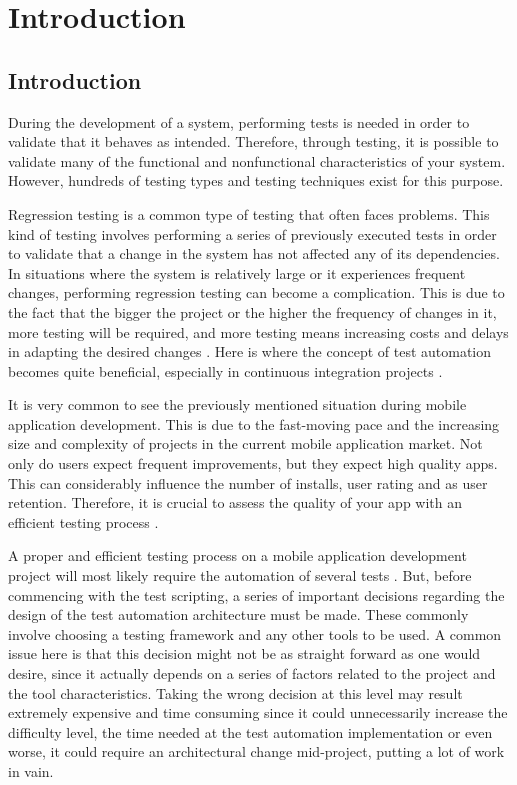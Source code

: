%
\chapter{Introduction}
\label{sec:intro}

\section{Introduction}

During the development of a system, performing tests is needed in order to validate that it behaves as intended. Therefore, through testing, it is possible to validate many of the functional and nonfunctional characteristics of your system. However, hundreds of testing types and testing techniques exist for this purpose.

Regression testing is a common type of testing that often faces problems. This kind of testing involves performing a series of previously executed tests in order to validate that a change in the system has not affected any of its dependencies. In situations where the system is relatively large or it experiences frequent changes, performing regression testing can become a complication. This is due to the fact that the bigger the project or the higher the frequency of changes in it, more testing will be required, and more testing means increasing costs and delays in adapting the desired changes \cite{Google Automate UI tests}. Here is where the concept of test automation becomes quite beneficial, especially in continuous integration projects \cite{ISTQB}.

It is very common to see the previously mentioned situation during mobile application development. This is due to the fast-moving pace and the increasing size and complexity of projects in the current mobile application market. Not only do users expect frequent improvements, but they expect high quality apps. This can considerably influence the number of installs, user rating and as user retention. Therefore, it is crucial to assess the quality of your app with an efficient testing process \cite{Google App Quality}.

A proper and efficient testing process on a mobile application development project will most likely require the automation of several tests \cite{Gaurav Why Test Automation}. But, before commencing with the test scripting, a series of important decisions regarding the design of the test automation architecture must be made. These commonly involve choosing a testing framework and any other tools to be used. A common issue here is that this decision might not be as straight forward as one would desire, since it actually depends on a series of factors related to the project and the tool characteristics. Taking the wrong decision at this level may result extremely expensive and time consuming since it could unnecessarily increase the difficulty level, the time needed at the test automation implementation or even worse, it could require an architectural change mid-project, putting a lot of work in vain. 


